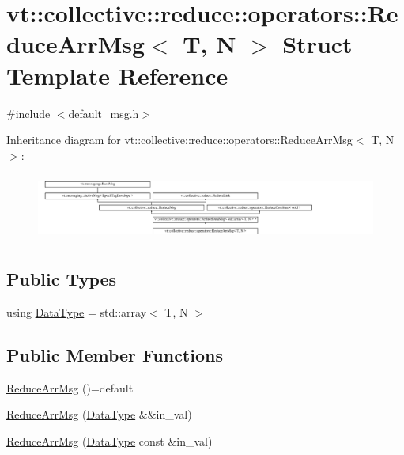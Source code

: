 \hypertarget{structvt_1_1collective_1_1reduce_1_1operators_1_1_reduce_arr_msg}{}\section{vt\+:\+:collective\+:\+:reduce\+:\+:operators\+:\+:Reduce\+Arr\+Msg$<$ T, N $>$ Struct Template Reference}
\label{structvt_1_1collective_1_1reduce_1_1operators_1_1_reduce_arr_msg}


{\ttfamily \#include $<$default\+\_\+msg.\+h$>$}

Inheritance diagram for vt\+:\+:collective\+:\+:reduce\+:\+:operators\+:\+:Reduce\+Arr\+Msg$<$ T, N $>$\+:\begin{figure}[H]
\begin{center}
\leavevmode
\includegraphics[height=2.216944cm]{structvt_1_1collective_1_1reduce_1_1operators_1_1_reduce_arr_msg}
\end{center}
\end{figure}
\subsection*{Public Types}
\begin{DoxyCompactItemize}
\item 
using \hyperlink{structvt_1_1collective_1_1reduce_1_1operators_1_1_reduce_arr_msg_aea7790c640396dc428ddc98a1e0e7c7c}{Data\+Type} = std\+::array$<$ T, N $>$
\end{DoxyCompactItemize}
\subsection*{Public Member Functions}
\begin{DoxyCompactItemize}
\item 
\hyperlink{structvt_1_1collective_1_1reduce_1_1operators_1_1_reduce_arr_msg_a3b3aa1ecb078b1c733a81cd79be27e00}{Reduce\+Arr\+Msg} ()=default
\item 
\hyperlink{structvt_1_1collective_1_1reduce_1_1operators_1_1_reduce_arr_msg_a88bdfa2c0fad10fd90331f00272c5816}{Reduce\+Arr\+Msg} (\hyperlink{structvt_1_1collective_1_1reduce_1_1operators_1_1_reduce_arr_msg_aea7790c640396dc428ddc98a1e0e7c7c}{Data\+Type} \&\&in\+\_\+val)
\item 
\hyperlink{structvt_1_1collective_1_1reduce_1_1operators_1_1_reduce_arr_msg_a3878c089682cd26d80245e575a2d9a54}{Reduce\+Arr\+Msg} (\hyperlink{structvt_1_1collective_1_1reduce_1_1operators_1_1_reduce_arr_msg_aea7790c640396dc428ddc98a1e0e7c7c}{Data\+Type} const \&in\+\_\+val)
\end{DoxyCompactItemize}
